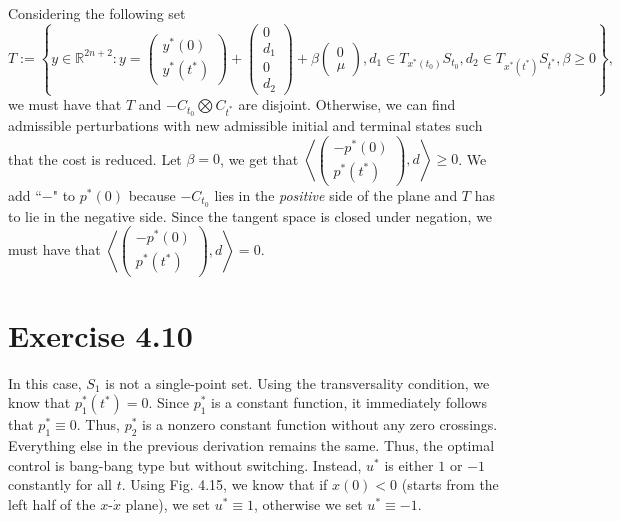 \documentclass[11pt]{report}
\begin{document}
Considering the following set
\begin{equation}
T:=\left\{y \in \mathbb{R}^{2n+2}: y=\left(\begin{array}{l}y^{*}(0)\\y^{*}(t^*)\end{array}\right)+\left(\begin{array}{l}0\\d_1\\0\\d_2\end{array}\right)+\beta \left(\begin{array}{l}0\\\mu\end{array}\right), d_1 \in T_{x^{*}\left(t_0\right)} S_{t_0}, d_2 \in T_{x^{*}\left(t^*\right)} S_{t^*}, \beta \geq 0\right\},
\end{equation}
we must have that $T$ and $-C_{t_0} \bigotimes C_{t^*}$ are disjoint. Otherwise, we can find admissible perturbations with new admissible initial and terminal states such that the cost is reduced. Let $\beta=0$, we get that $\left\langle \left(\begin{array}{l}-p^*(0)\\p^{*}(t^*)\end{array}\right), d \right\rangle \geq 0$. We add ``$-$" to $p^*(0)$ because $-C_{t_0}$ lies in the {\em positive} side of the plane and $T$ has to lie in the negative side. Since the tangent space is closed under negation, we must have that $\left\langle \left(\begin{array}{l}-p^*(0)\\p^{*}(t^*)\end{array}\right), d \right\rangle = 0$.

\section*{Exercise 4.10}
In this case, $S_1$ is not a single-point set. Using the transversality condition, we know that $p_1^*(t^*) = 0$. Since $p_1^*$ is a constant function, it immediately follows that $p_1^* \equiv 0$. Thus, $p_2^*$ is a nonzero constant function without any zero crossings. Everything else in the previous derivation remains the same. Thus, the optimal control is bang-bang type but without switching. Instead, $u^*$ is either $1$ or $-1$ constantly for all $t$. Using Fig. 4.15, we know that if $x(0) < 0$ (starts from the left half of the $x$-$\dot{x}$ plane), we set $u^* \equiv 1$, otherwise we set $u^* \equiv -1$.
\end{document}
